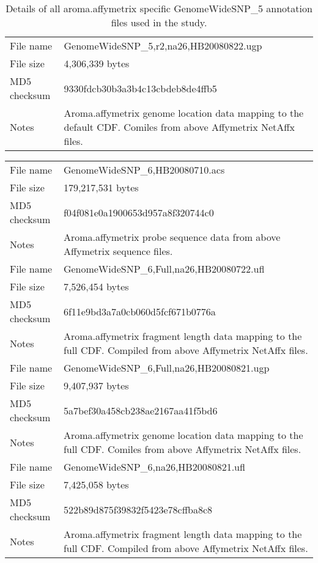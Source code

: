 \documentclass[10pt,a4paper]{article}
\begin{document}
\begin{table}[htp]
\begin{center}
\begin{tabular}{lp{}}
\hline
File name    & GenomeWideSNP\_5,r2,na26,HB20080822.ugp \\
File size    & 4,306,339 bytes \\
MD5 checksum & 9330fdcb30b3a3b4c13cbdeb8de4ffb5 \\
Notes        & Aroma.affymetrix genome location data mapping to the default CDF.  Comiles from above Affymetrix NetAffx files. \\
\hline
\end{tabular}
\end{center}
\caption{Details of all aroma.affymetrix specific GenomeWideSNP\_5 annotation files used in the study.}
\label{tblGWSFiveAromaAffymetrix}
\end{table}



\begin{table}[htp]
\begin{center}
\begin{tabular}{lp{}}
\hline
File name    & GenomeWideSNP\_6,HB20080710.acs \\
File size    & 179,217,531 bytes \\
MD5 checksum & f04f081e0a1900653d957a8f320744c0 \\
Notes        & Aroma.affymetrix probe sequence data from above Affymetrix sequence files. \\
\hline
File name    & GenomeWideSNP\_6,Full,na26,HB20080722.ufl \\
File size    & 7,526,454 bytes \\
MD5 checksum & 6f11e9bd3a7a0cb060d5fcf671b0776a \\
Notes        & Aroma.affymetrix fragment length data mapping to the full CDF.  Compiled from above Affymetrix NetAffx files. \\
\hline
File name    & GenomeWideSNP\_6,Full,na26,HB20080821.ugp \\
File size    & 9,407,937 bytes \\
MD5 checksum & 5a7bef30a458cb238ae2167aa41f5bd6 \\
Notes        & Aroma.affymetrix genome location data mapping to the full CDF.  Comiles from above Affymetrix NetAffx files. \\
\hline
File name    & GenomeWideSNP\_6,na26,HB20080821.ufl \\
File size    & 7,425,058 bytes \\
MD5 checksum & 522b89d875f39832f5423e78cffba8c8 \\
Notes        & Aroma.affymetrix fragment length data mapping to the full CDF.  Compiled from above Affymetrix NetAffx files. \\

\end{tabular}
\end{center}
\end{table}
\end{document}
